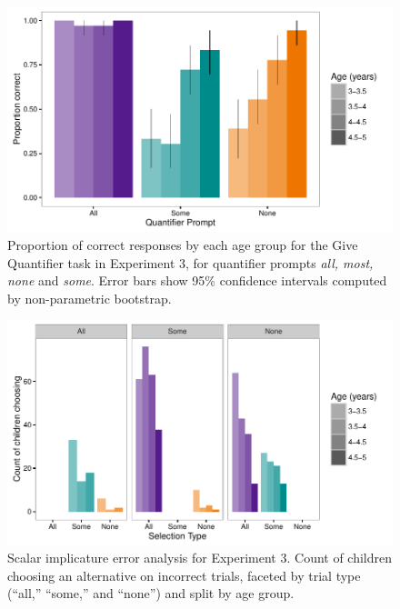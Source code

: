 \documentclass[man]{apa2}
\begin{document}
{\begin{figure}
 \begin{center}
  \includegraphics[width=6in]{figures/exp3_GQperf.pdf}
  \caption{\label{fig:exp3_GQright} Proportion of correct responses by each age group for the Give Quantifier task in Experiment 3, for quantifier prompts \textit{all, most, none} and \textit{some}. Error bars show 95\% confidence intervals computed by non-parametric bootstrap.}
 \end{center}
\end{figure}

\newpage

\begin{figure}
 \begin{center}
  \includegraphics[width=6in]{figures/exp3_SIwrong.pdf}
  \caption{\label{fig:exp3_wrong} Scalar implicature error analysis for Experiment 3. Count of children choosing an alternative on incorrect trials, faceted by trial type (``all,'' ``some,'' and ``none'') and split by age group.}
 \end{center}
\end{figure}

}
\end{document}
